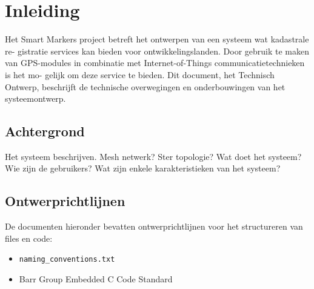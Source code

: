 \section{Inleiding}
Het Smart Markers project betreft het ontwerpen van een systeem wat kadastrale re- gistratie services kan bieden voor ontwikkelingslanden. Door gebruik te maken van GPS-modules in combinatie met Internet-of-Things communicatietechnieken is het mo- gelijk om deze service te bieden. Dit document, het Technisch Ontwerp, beschrijft de technische overwegingen en onderbouwingen van het systeemontwerp.

\subsection{Achtergrond}
Het systeem beschrijven. Mesh netwerk? Ster topologie?
Wat doet het systeem?
Wie zijn de gebruikers?
Wat zijn enkele karakteristieken van het systeem?

\subsection{Ontwerprichtlijnen}
De documenten hieronder bevatten ontwerprichtlijnen voor het structureren van files en code:
\begin{itemize}
    \item \texttt{naming\_conventions.txt}
    \item Barr Group Embedded C Code Standard \citep{BARR_STD}
\end{itemize}
